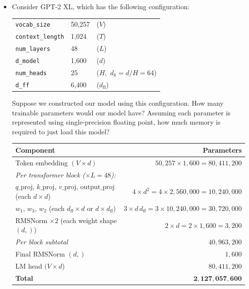 \documentclass[letterpaper]{article}
\begin{document}
\begin{itemize}
	\item[(a)] Consider GPT-2 XL, which has the following configuration:

	\begin{center}
	\begin{tabular}{lll}
		\texttt{vocab\_size} & 50,257 & ($V$) \\
		\texttt{context\_length} & 1,024 & ($T$) \\
		\texttt{num\_layers} & 48 & ($L$) \\
		\texttt{d\_model} & 1,600 & ($d$) \\
		\texttt{num\_heads} & 25 & ($H$,\ $d_k = d/H = 64$) \\
		\texttt{d\_ff} & 6,400 & ($d_\text{ff}$) \\
	\end{tabular}
	\end{center}

	Suppose we constructed our model using this configuration. How many trainable parameters would our model have? Assuming each parameter is represented using single-precision floating point, how much memory is required to just load this model?

	\begin{center}
	\begin{tabular}{lr}
	\hline
	\textbf{Component} & \textbf{Parameters} \\
	\hline
	Token embedding $(V \times d)$ & $50{,}257 \times 1{,}600 = 80{,}411{,}200$ \\
	\hline
	\multicolumn{2}{l}{\textit{Per transformer block ($\times L = 48$):}} \\
	\quad $q\_\text{proj}$, $k\_\text{proj}$, $v\_\text{proj}$, $\text{output\_proj}$ (each $d\times d$) & $4 \times d^2 = 4 \times 2{,}560{,}000 = 10{,}240{,}000$ \\
	\quad $w_1$, $w_3$, $w_2$ (each $d_\text{ff}\times d$ or $d\times d_\text{ff}$) & $3 \times d\,d_\text{ff} = 3 \times 10{,}240{,}000 = 30{,}720{,}000$ \\
	\quad RMSNorm $\times 2$ (each weight shape $(d,)$) & $2 \times d = 2 \times 1{,}600 = 3{,}200$ \\
	\quad \textit{Per block subtotal} & $40{,}963{,}200$ \\
	\hline
	Final RMSNorm $(d,)$ & $1{,}600$ \\
	LM head $(V \times d$) & $80{,}411{,}200$ \\
	\hline
	\textbf{Total} & $\mathbf{2{,}127{,}057{,}600}$ \\
	\hline
	\end{tabular}
	\end{center}


\end{itemize}
\end{document}
